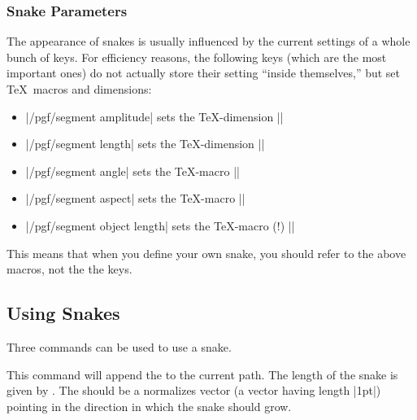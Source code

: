 \subsubsection{Snake Parameters}

The appearance of snakes is usually influenced by the current settings
of a whole bunch of keys. For efficiency reasons, the following keys
(which are the most important ones) do not actually store their
setting ``inside themselves,'' but set \TeX\ macros and dimensions:
\begin{itemize}
\item |/pgf/segment amplitude| sets the \TeX-dimension |\pgfsnakesegmentamplitude|
\item |/pgf/segment length| sets the \TeX-dimension |\pgfsnakesegmentlength|
\item |/pgf/segment angle| sets the \TeX-macro |\pgfsnakesegmentangle|
\item |/pgf/segment aspect| sets the \TeX-macro   |\pgfsnakesegmentaspect|
\item |/pgf/segment object length| sets the \TeX-macro (!) |\pgfsnakesegmentobjectlength|
\end{itemize}

This means that when you define your own snake, you should refer to
the above macros, not the the keys.



\subsection{Using Snakes}

Three commands can be used to use a snake.

\begin{command}{\pgfpathsnakealongvector{}}
  This command will append the  to the current path. The
  length of the snake is given by . The 
  should be a normalizes vector (a vector having length |1pt|)
  pointing in the direction in which the snake should grow.
\begin{codeexample}[]
\end{codeexample}
\end{command}

